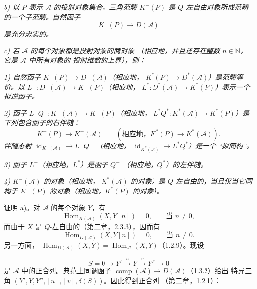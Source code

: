 \clearpage
{}%
\begingroup\small\setlength{\parskip}{0pt}\setlength{\emergencystretch}{1.5em}
\setlength{\abovedisplayskip}{4pt plus 2pt minus 2pt}%
\setlength{\belowdisplayskip}{4pt plus 2pt minus 2pt}%

\noindent\textit{b) 以 $P$ 表示 $\mathcal A$ 的投射对象集合。三角范畴
$K^{-}(P)$ 是 $Q$-左自由对象所成范畴的一个子范畴。自然函子}
\[
K^{-}(P)\longrightarrow D(\mathcal A)
\]
\noindent\textit{是充分忠实的。}

\noindent\textit{c) 若 $\mathcal A$ 的每个对象都是投射对象的商对象
（相应地，并且还存在整数 $n\in\mathbb N$，它是 $\mathcal A$ 中所有对象的
投射维数的上界），则：}

\noindent\textit{1) 自然函子
$K^{-}(P)\longrightarrow D^{-}(\mathcal A)$（相应地，
$K^{*}(P)\longrightarrow D^{*}(\mathcal A)$）是范畴等价。以
$L^{-}\colon D^{-}(\mathcal A)\longrightarrow K^{-}(P)$（相应地，
$L^{*}\colon D^{*}(\mathcal A)\longrightarrow K^{*}(P)$）表示一个拟逆函子。}

\noindent\textit{2) 函子
$L^{-}Q^{-}\colon K^{-}(\mathcal A)\longrightarrow K^{-}(P)$（相应地，
$L^{*}Q^{*}\colon K^{*}(\mathcal A)\longrightarrow K^{*}(P)$）是下列包含函子的右伴随：}
\[
K^{-}(P)\longrightarrow K^{-}(\mathcal A)
\qquad
(\text{相应地，}K^{*}(P)\longrightarrow K^{*}(\mathcal A)).
\]
\noindent\textit{伴随态射
$\operatorname{id}_{K^{-}(\mathcal A)}\longrightarrow L^{-}Q^{-}$
（相应地，
$\operatorname{id}_{K^{*}(\mathcal A)}\longrightarrow L^{*}Q^{*}$）是一个
``拟同构''。}

\noindent\textit{3) 函子 $L^{-}$（相应地，$L^{*}$）是函子 $Q^{-}$
（相应地，$Q^{*}$）的左伴随。}

\noindent\textit{4) $K^{-}(\mathcal A)$ 的对象（相应地，
$K^{*}(\mathcal A)$ 的对象）是 $Q$-左自由的，当且仅当它同构于
$K^{-}(P)$ 的对象（相应地，$K^{*}(P)$ 的对象）。}

证明 a)。对 $\mathcal A$ 的每个对象 $Y$，有
\[
\operatorname{Hom}_{K(\mathcal A)}(X,Y[n])=0,
\qquad\text{当 }n\neq0,
\]
而由于 $X$ 是 $Q$-左自由的（第二章，2.3.3），因而有
\[
\operatorname{Hom}_{D(\mathcal A)}(X,Y[n])=0,
\qquad\text{当 }n\neq0.
\]
另一方面，
$\operatorname{Hom}_{D(\mathcal A)}(X,Y)
=\operatorname{Hom}_{\mathcal A}(X,Y)$（1.2.9）。现设

\[
S=0\longrightarrow Y'\xrightarrow{u}Y\xrightarrow{v}Y''
\longrightarrow0
\]
是 $\mathcal A$ 中的正合列。典范上同调函子
$\operatorname{comp}(\mathcal A)\longrightarrow D(\mathcal A)$（1.3.2）给出
特异三角 $(Y',Y,Y'',[u],[v],\delta(S))$。因此得到正合列
（第二章，1.2.1）：

